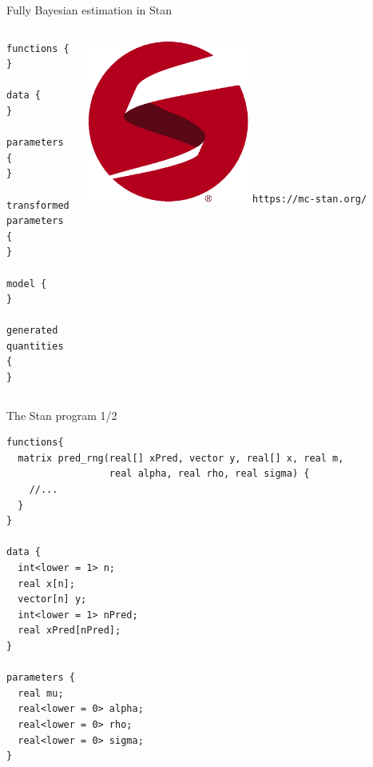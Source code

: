 \documentclass[ignorenonframetext,xcolor=pdflatex,table,dvipsnames,serif]{beamer}
\begin{document}
\begin{frame}[fragile]{Fully Bayesian estimation in Stan}
\begin{columns}
\begin{column}{0.5\textwidth}
\begin{Verbatim}[fontsize=\footnotesize]
functions {
}

data {
}

parameters {
}

transformed parameters {
}

model {
}

generated quantities {
}
\end{Verbatim}
\end{column}
\begin{column}{0.5\textwidth}  %
\begin{center}
  \includegraphics[width=0.5\textwidth]{logo_tm}
  \texttt{https://mc-stan.org/}
\end{center}
\end{column}
\end{columns}
\end{frame}


\begin{frame}[fragile]{The Stan program 1/2}
\begin{Verbatim}[fontsize=\scriptsize]
functions{
  matrix pred_rng(real[] xPred, vector y, real[] x, real m, 
                  real alpha, real rho, real sigma) {
    //...
  }	
}

data {
  int<lower = 1> n;
  real x[n];
  vector[n] y;
  int<lower = 1> nPred;
  real xPred[nPred];
}

parameters {
  real mu;
  real<lower = 0> alpha;  
  real<lower = 0> rho;
  real<lower = 0> sigma;
}
\end{Verbatim}
\end{frame}
\end{document}
